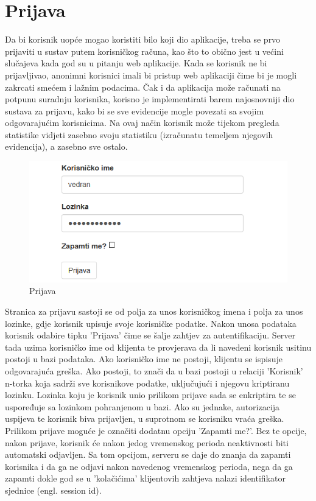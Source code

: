 \documentclass[times, utf8, zavrsni]{fer}
\begin{document}
\section{Prijava}
Da bi korisnik uopće mogao koristiti bilo koji dio aplikacije, treba se prvo prijaviti u sustav putem korisničkog računa, kao što to obično jest u većini slučajeva kada god su u pitanju web aplikacije. Kada se korisnik ne bi prijavljivao, anonimni korisnici imali bi pristup web aplikaciji čime bi je mogli zakrcati smećem i lažnim podacima. Čak i da aplikacija može računati na potpunu suradnju korisnika, korisno je implementirati barem najosnovniji dio sustava za prijavu, kako bi se sve evidencije mogle povezati sa svojim odgovarajućim korisnicima. Na ovaj način korisnik može tijekom pregleda statistike vidjeti zasebno svoju statistiku (izračunatu temeljem njegovih evidencija), a zasebno sve ostalo.\\

\begin{figure}[H]
\centering
\includegraphics[width=\textwidth,height=\textheight,keepaspectratio]{img/prijava.png}
\caption{Prijava}
\label{fig:prijava}
\end{figure}

Stranica za prijavu sastoji se od polja za unos korisničkog imena i polja za unos lozinke, gdje korisnik upisuje svoje korisničke podatke. Nakon unosa podataka korisnik odabire tipku 'Prijava' čime se šalje zahtjev za autentifikaciju. Server tada uzima korisničko ime od klijenta te provjerava da li navedeni korisnik usitinu postoji u bazi podataka. Ako korisničko ime ne postoji, klijentu se ispisuje odgovarajuća greška. Ako postoji, to znači da u bazi postoji u relaciji 'Korisnik' n-torka koja sadrži sve korisnikove podatke, uključujući i njegovu kriptiranu lozinku. Lozinka koju je korisnik unio prilikom prijave sada se enkriptira te se uspoređuje sa lozinkom pohranjenom u bazi. Ako su jednake, autorizacija uspijeva te korisnik biva prijavljen, u suprotnom se korisniku vraća greška.
Prilikom prijave moguće je označiti dodatnu opciju 'Zapamti me?'. Bez te opcije, nakon prijave, korisnik će nakon jedog vremenskog perioda neaktivnosti biti automatski odjavljen. Sa tom opcijom, serveru se daje do znanja da zapamti korisnika i da ga ne odjavi nakon navedenog vremenskog perioda, nega da ga zapamti dokle god se u 'kolačićima' klijentovih zahtjeva nalazi identifikator sjednice (engl. session id).\\
\end{document}
